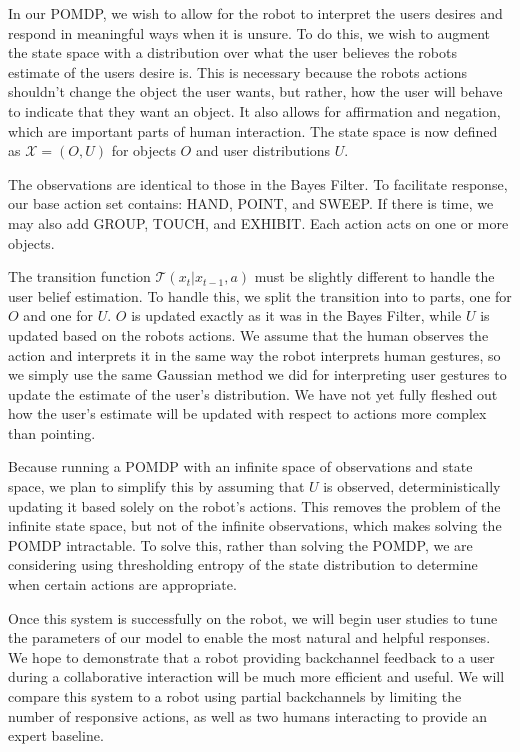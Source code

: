 \documentclass[a4paper, 11pt]{article} %
\begin{document}
In our POMDP, we wish to allow for the robot to interpret the users desires and respond in meaningful ways when it is unsure. To do this, we wish to augment the state space with a distribution over what the user believes the robots estimate of the users desire is. This is necessary because the robots actions shouldn't change the object the user wants, but rather, how the user will behave to indicate that they want an object. It also allows for affirmation and negation, which are important parts of human interaction. The state space is now defined as $\mathcal{X} = (O, U)$ for objects $O$ and user distributions $U$.

The observations are identical to those in the Bayes Filter. To facilitate response, our base action set contains: HAND, POINT, and SWEEP. If there is time, we may also add GROUP, TOUCH, and EXHIBIT. Each action acts on one or more objects.

The transition function $\mathcal{T}(x_t | x_{t-1}, a)$ must be slightly different to handle the user belief estimation. To handle this, we split the transition into to parts, one for $O$ and one for $U$. $O$ is updated exactly as it was in the Bayes Filter, while $U$ is updated  based on the robots actions. We assume that the human observes the action and interprets it in the same way the robot interprets human gestures, so we simply use the same Gaussian method we did for interpreting user gestures to update the estimate of the user's distribution. We have not yet fully fleshed out how the user's estimate will be updated with respect to actions more complex than pointing.

Because running a POMDP with an infinite space of observations and state space, we plan to simplify this by assuming that $U$ is observed, deterministically updating it based solely on the robot's actions. This removes the problem of the infinite state space, but not of the infinite observations, which makes solving the POMDP intractable. To solve this, rather than solving the POMDP, we are considering using thresholding entropy of the state distribution to determine when certain actions are appropriate.

Once this system is successfully on the robot, we will begin user studies to tune the parameters of our model to enable the most natural and helpful responses. We hope to demonstrate that a robot providing backchannel feedback to a user during a collaborative interaction will be much more efficient and useful. We will compare this system to a robot using partial backchannels by limiting the number of responsive actions, as well as two humans interacting to provide an expert baseline.
\end{document}
